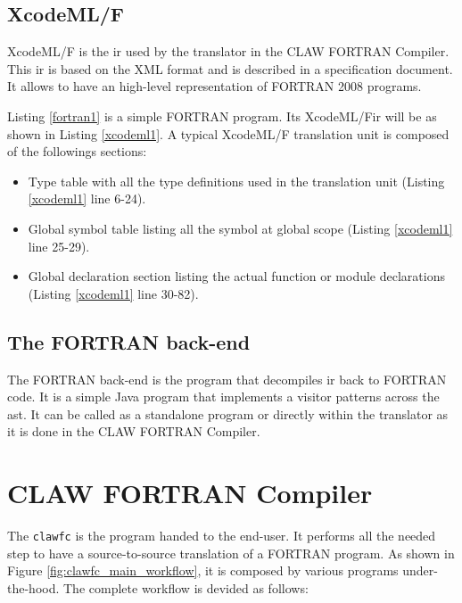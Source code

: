 \documentclass[a4paper, 11pt]{report}
\def\clawfcomp{CLAW FORTRAN Compiler\xspace}
\def\xcodeml{XcodeML/F\xspace}
\def\clawfc{\lstinline!clawfc!\xspace}
\begin{document}
\subsection{\xcodeml}
\xcodeml\cite{omni:xcodemlf95,omni:xcodemlf2008} is the \gls{ir} used by the translator in the CLAW FORTRAN Compiler. This \gls{ir} is based on the XML format and is described in a specification document. It allows to have an high-level representation of FORTRAN 2008 programs.

Listing \ref{fortran1} is a simple FORTRAN program. Its \xcodeml \gls{ir} will be as shown in Listing \ref{xcodeml1}. A typical \xcodeml translation unit is composed of the followings sections: 
\begin{itemize}
\item Type table with all the type definitions used in the translation unit (Listing \ref{xcodeml1} line 6-24).
\item Global symbol table listing all the symbol at global scope (Listing \ref{xcodeml1} line 25-29).
\item Global declaration section listing the actual function or module declarations (Listing \ref{xcodeml1} line 30-82).
\end{itemize}





\subsection{The FORTRAN back-end}
The FORTRAN back-end is the program that decompiles \gls{ir} back to FORTRAN code. It is a simple Java program that implements a visitor patterns across the \gls{ast}. It can be called as a standalone program or directly within the translator as it is done in the \clawfcomp.

\section{\clawfcomp}

The \clawfc is the program handed to the end-user. It performs all the needed step to have a source-to-source translation of a FORTRAN program. As shown in Figure \ref{fig:clawfc_main_workflow}, it is composed by various programs under-the-hood. The complete workflow is devided as follows: 
\end{document}
